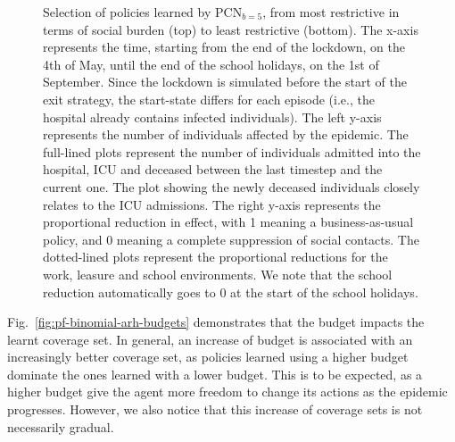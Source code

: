 \documentclass{article}
\newcommand\todo[1]{\textcolor{red}{TODO: #1}}
\begin{document}
\begin{figure}
    \centering
    
    \caption{Selection of policies learned by $\text{PCN}_{b=5}$, from most restrictive in terms of social burden (top) to least restrictive (bottom). The x-axis represents the time, starting from the end of the lockdown, on the 4th of May, until the end of the school holidays, on the 1st of September. Since the lockdown is simulated before the start of the exit strategy, the start-state differs for each episode (i.e., the hospital already contains infected individuals). The left y-axis represents the number of individuals affected by the epidemic. The full-lined plots represent the number of individuals admitted into the hospital, ICU and deceased between the last timestep and the current one. The plot showing the newly deceased individuals closely relates to the ICU admissions. The right y-axis represents the proportional reduction in effect, with 1 meaning a business-as-usual policy, and 0 meaning a complete suppression of social contacts. The dotted-lined plots represent the proportional reductions for the work, leasure and school environments. We note that the school reduction automatically goes to 0 at the start of the school holidays.
    }
    \label{fig:policy-execution}
\end{figure}

Fig.~\ref{fig:pf-binomial-arh-budgets} demonstrates that the budget impacts the learnt coverage set. In general, an increase of budget is associated with an increasingly better coverage set, as policies learned using a higher budget dominate the ones learned with a lower budget. This is to be expected, as a higher budget give the agent more freedom to change its actions as the epidemic progresses. However, we also notice that this increase of coverage sets is not necessarily gradual. %
\end{document}
